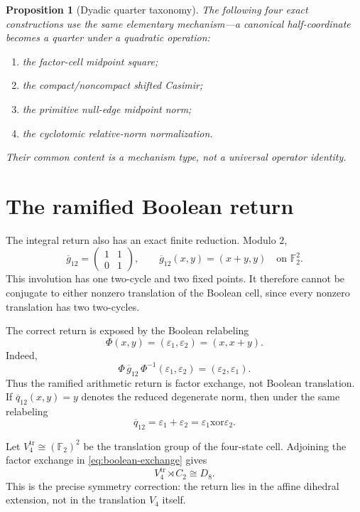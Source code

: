 \documentclass[11pt]{article}
\newtheorem{proposition}[theorem]{Proposition}
\theoremstyle{remark}
\begin{document}
\begin{proposition}[Dyadic quarter taxonomy]
The following four exact constructions use the same elementary mechanism---a
canonical half-coordinate becomes a quarter under a quadratic operation:
\begin{enumerate}[label=(\roman*)]
\item the factor-cell midpoint square;
\item the compact/noncompact shifted Casimir;
\item the primitive null-edge midpoint norm;
\item the cyclotomic relative-norm normalization.
\end{enumerate}
Their common content is a mechanism type, not a universal operator identity.
\end{proposition}

\section{The ramified Boolean return}

The integral return also has an exact finite reduction.  Modulo $2$,
\[
\overline g_{12}
=\begin{pmatrix}1&1\\0&1\end{pmatrix},
\qquad
\overline g_{12}(x,y)=(x+y,y)
\quad\text{on }\mathbb F_2^2.
\]
This involution has one two-cycle and two fixed points.  It therefore cannot
be conjugate to either nonzero translation of the Boolean cell, since every
nonzero translation has two two-cycles.

The correct return is exposed by the Boolean relabeling
\[
\Phi(x,y)=(\varepsilon_1,\varepsilon_2)=(x,x+y).
\]
Indeed,
\begin{equation}
\boxed{
\Phi\,\overline g_{12}\,\Phi^{-1}
(\varepsilon_1,\varepsilon_2)
=(\varepsilon_2,\varepsilon_1).
}
\label{eq:boolean-exchange}
\end{equation}
Thus the ramified arithmetic return is factor exchange, not Boolean
translation.  If $\overline q_{12}(x,y)=y$ denotes the reduced degenerate norm,
then under the same relabeling
\begin{equation}
\boxed{
\overline q_{12}
=\varepsilon_1+\varepsilon_2
=\varepsilon_1\mathbin{\mathrm{xor}}\varepsilon_2.
}
\label{eq:boolean-xor}
\end{equation}

Let $V_4^{\mathrm{tr}}\cong(\mathbb F_2)^2$ be the translation group of the
four-state cell.  Adjoining the factor exchange in
\eqref{eq:boolean-exchange} gives
\[
\boxed{
V_4^{\mathrm{tr}}\rtimes C_2\cong D_8.
}
\]
This is the precise symmetry correction: the return lies in the affine
dihedral extension, not in the translation $V_4$ itself.
\end{document}
